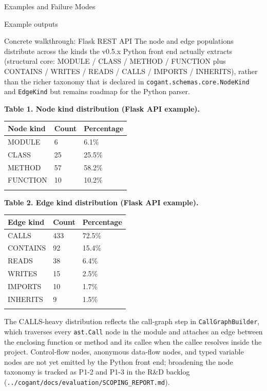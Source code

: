 \documentclass[
  ignorenonframetext,
]{beamer}
\newcounter{none} %
\begin{document}
\begin{frame}[fragile]{Examples and Failure Modes}
\begin{block}{Example outputs}
\begin{block}{Concrete walkthrough: Flask REST API}
The node and edge populations distribute across the kinds the v0.5.x
Python front end actually extracts (structural core: MODULE / CLASS /
METHOD / FUNCTION plus CONTAINS / WRITES / READS / CALLS / IMPORTS /
INHERITS), rather than the richer taxonomy that is declared in
\texttt{cogant.schemas.core.NodeKind} and \texttt{EdgeKind} but remains
roadmap for the Python parser.

\textbf{Table 1. Node kind distribution (Flask API example).}

{\def\LTcaptype{none} %
\begin{longtable}[]{@{}lll@{}}
\toprule\noalign{}
Node kind & Count & Percentage \\
\midrule\noalign{}
\endhead
MODULE & 6 & 6.1\% \\
CLASS & 25 & 25.5\% \\
METHOD & 57 & 58.2\% \\
FUNCTION & 10 & 10.2\% \\
\bottomrule\noalign{}
\end{longtable}
}

\textbf{Table 2. Edge kind distribution (Flask API example).}

{\def\LTcaptype{none} %
\begin{longtable}[]{@{}lll@{}}
\toprule\noalign{}
Edge kind & Count & Percentage \\
\midrule\noalign{}
\endhead
CALLS & 433 & 72.5\% \\
CONTAINS & 92 & 15.4\% \\
READS & 38 & 6.4\% \\
WRITES & 15 & 2.5\% \\
IMPORTS & 10 & 1.7\% \\
INHERITS & 9 & 1.5\% \\
\bottomrule\noalign{}
\end{longtable}
}

The CALLS-heavy distribution reflects the call-graph step in
\texttt{CallGraphBuilder}, which traverses every \texttt{ast.Call} node
in the module and attaches an edge between the enclosing function or
method and its callee when the callee resolves inside the project.
Control-flow nodes, anonymous data-flow nodes, and typed variable nodes
are not yet emitted by the Python front end; broadening the node
taxonomy is tracked as P1-2 and P1-3 in the R\&D backlog
(\texttt{../cogant/docs/evaluation/SCOPING\_REPORT.md}).
\end{block}


\end{block}
\end{frame}
\end{document}
